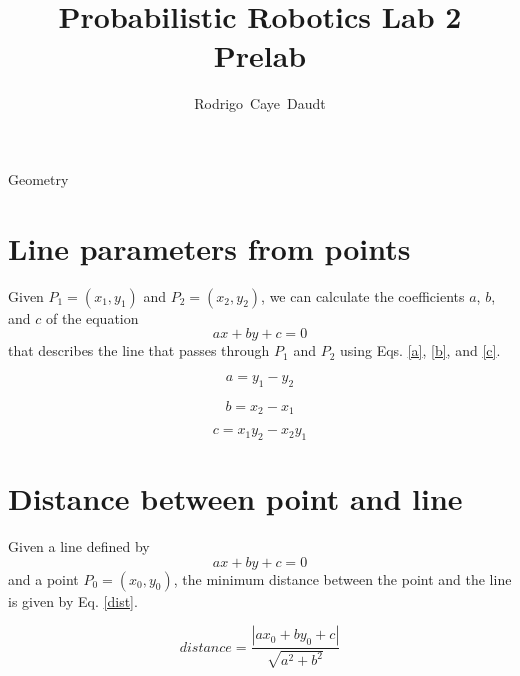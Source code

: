 \documentclass[11pt,oneside,a4paper]{article}
\begin{document}
\title{Probabilistic Robotics Lab 2 \\ Prelab}
%
%
\author{Rodrigo~Caye~Daudt}


%
{Geometry}


\maketitle







\section{Line parameters from points}

Given $P_1 = (x_1 , y_1)$ and $P_2 = (x_2 , y_2)$, we can calculate the coefficients $a$, $b$, and $c$ of the equation $$ax + by + c = 0$$ that describes the line that passes through $P_1$ and $P_2$ using Eqs. \ref{a}, \ref{b}, and \ref{c}.

\begin{equation}\label{a}
a = y_1 - y_2
\end{equation}

\begin{equation}\label{b}
b = x_2 - x_1
\end{equation}

\begin{equation}\label{c}
c = x_1 y_2 - x_2 y_1
\end{equation}

\section{Distance between point and line}

Given a line defined by $$ax + by + c = 0$$ and a point $P_0 = (x_0 , y_0 )$, the minimum distance between the point and the line is given by Eq. \ref{dist}.

\begin{equation}\label{dist}
distance = \frac{|ax_0 +by_0 +c|}{\sqrt{a^2 + b^2}}
\end{equation}
\end{document}
